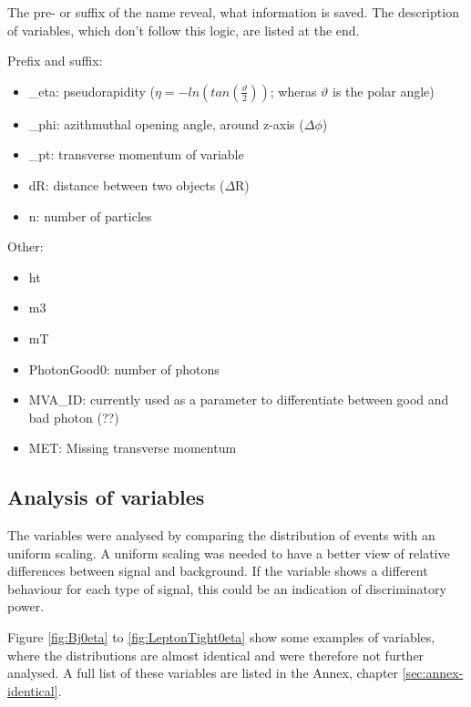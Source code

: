 \documentclass[11pt]{scrartcl}
\begin{document}
The pre- or suffix of the name reveal, what information is saved. The description of variables, which don't follow this logic, are listed at the end. 

Prefix and suffix:
\begin{itemize}
	  \item \_eta: pseudorapidity ($\eta = -ln(tan(\frac{\vartheta}{2}))$; wheras $\vartheta$ is the polar angle)
	  \item \_phi: azithmuthal opening angle, around z-axis ($\Delta\phi$)
	  \item \_pt: transverse momentum of variable
	  \item dR: distance between two objects ($\Delta$R)
	  \item n: number of particles
\end{itemize}

Other:
\begin{itemize}
  \item ht
  \item m3
  \item mT
  \item PhotonGood0: number of photons
  \item MVA\_ID: currently used as a parameter to differentiate between good and bad photon (??)
  \item MET: Missing transverse momentum
\end{itemize}

	\subsection{Analysis of variables}
	
The variables were analysed by comparing the distribution of events with an uniform scaling. A uniform scaling was needed to have a better view of relative differences between signal and background. If the variable shows a different behaviour for each type of signal, this could be an indication of discriminatory power. 

Figure \ref{fig:Bj0eta} to \ref{fig:LeptonTight0eta} show some examples of variables, where the distributions are almost identical and were therefore not further analysed. A full list of these variables are listed in the Annex, chapter \ref{sec:annex-identical}. 
\end{document}
